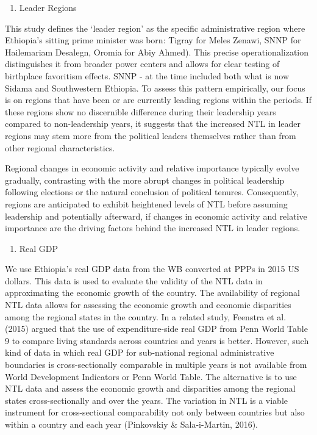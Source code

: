 \begin{enumerate}
\def\labelenumi{\arabic{enumi}.}
\item
  Leader Regions
\end{enumerate}

This study defines the `leader region' as the specific administrative
region where Ethiopia's sitting prime minister was born: Tigray for
Meles Zenawi, SNNP for Hailemariam Desalegn, Oromia for Abiy Ahmed).
This precise operationalization distinguishes it from broader power
centers and allows for clear testing of birthplace favoritism effects.
SNNP - at the time included both what is now Sidama and Southwestern
Ethiopia. To assess this pattern empirically, our focus is on regions
that have been or are currently leading regions within the periods. If
these regions show no discernible difference during their leadership
years compared to non-leadership years, it suggests that the increased
NTL in leader regions may stem more from the political leaders
themselves rather than from other regional characteristics.

Regional changes in economic activity and relative importance typically
evolve gradually, contrasting with the more abrupt changes in political
leadership following elections or the natural conclusion of political
tenures. Consequently, regions are anticipated to exhibit heightened
levels of NTL before assuming leadership and potentially afterward, if
changes in economic activity and relative importance are the driving
factors behind the increased NTL in leader regions.

\begin{enumerate}
\def\labelenumi{\arabic{enumi}.}
\setcounter{enumi}{1}
\item
  Real GDP
\end{enumerate}

We use Ethiopia's real GDP data from the WB converted at PPPs in 2015 US
dollars. This data is used to evaluate the validity of the NTL data in
approximating the economic growth of the country. The availability of
regional NTL data allows for assessing the economic growth and economic
disparities among the regional states in the country. In a related
study, Feenstra et al. (2015) argued that the use of expenditure-side
real GDP from Penn World Table 9 to compare living standards across
countries and years is better. However, such kind of data in which real
GDP for sub-national regional administrative boundaries is
cross-sectionally comparable in multiple years is not available from
World Development Indicators or Penn World Table. The alternative is to
use NTL data and assess the economic growth and disparities among the
regional states cross-sectionally and over the years. The variation in
NTL is a viable instrument for cross-sectional comparability not only
between countries but also within a country and each year (Pinkovskiy \&
Sala-i-Martin, 2016).

